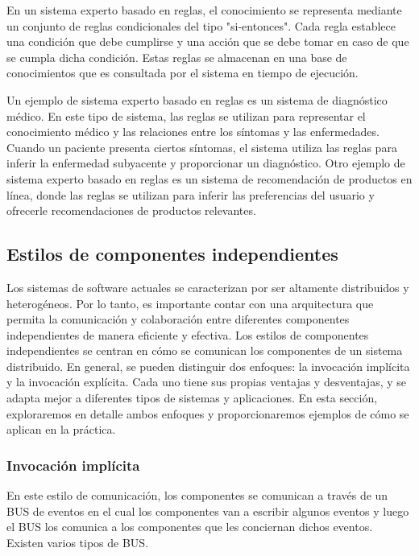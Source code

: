 \documentclass[executivepaper]{article}
\begin{document}
En un sistema experto basado en reglas, el conocimiento se representa mediante un conjunto de reglas condicionales del tipo "si-entonces". Cada regla establece una condición que debe cumplirse y una acción que se debe tomar en caso de que se cumpla dicha condición. Estas reglas se almacenan en una base de conocimientos que es consultada por el sistema en tiempo de ejecución.

Un ejemplo de sistema experto basado en reglas es un sistema de diagnóstico médico. En este tipo de sistema, las reglas se utilizan para representar el conocimiento médico y las relaciones entre los síntomas y las enfermedades. Cuando un paciente presenta ciertos síntomas, el sistema utiliza las reglas para inferir la enfermedad subyacente y proporcionar un diagnóstico. Otro ejemplo de sistema experto basado en reglas es un sistema de recomendación de productos en línea, donde las reglas se utilizan para inferir las preferencias del usuario y ofrecerle recomendaciones de productos relevantes.

\newpage
\subsection*{Estilos de componentes independientes}

Los sistemas de software actuales se caracterizan por ser altamente distribuidos y heterogéneos. Por lo tanto, es importante contar con una arquitectura que permita la comunicación y colaboración entre diferentes componentes independientes de manera eficiente y efectiva. Los estilos de componentes independientes se centran en cómo se comunican los componentes de un sistema distribuido. En general, se pueden distinguir dos enfoques: la invocación implícita y la invocación explícita. Cada uno tiene sus propias ventajas y desventajas, y se adapta mejor a diferentes tipos de sistemas y aplicaciones. En esta sección, exploraremos en detalle ambos enfoques y proporcionaremos ejemplos de cómo se aplican en la práctica.

\subsubsection*{Invocación implícita}

En este estilo de comunicación, los componentes se comunican a través de un BUS de eventos en el cual los componentes van a escribir algunos eventos y luego el BUS los comunica a los componentes que les conciernan dichos eventos. Existen varios tipos de BUS.
\end{document}

